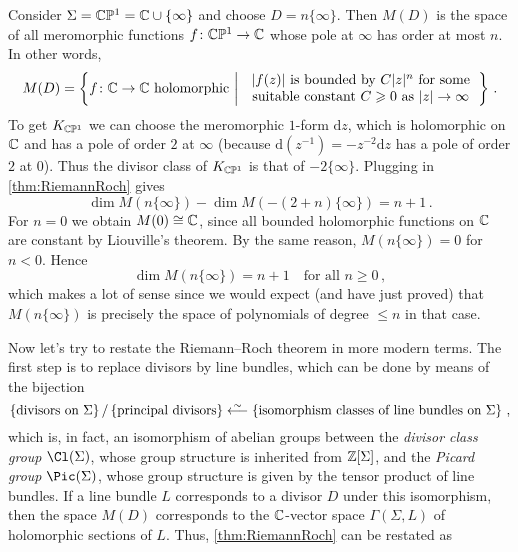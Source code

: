 	\begin{exm}
		Consider $\Sigma=\mathbb{C}\mathbb{P}^1=\mathbb{C}\cup\{\infty\}$ and choose $D=n\{\infty\}$. Then $M(D)$ is the space of all meromorphic functions $f\colon\IC\IP^1\morphism \IC$ whose pole at $\infty$ has order at most $n$. In other words,
		\begin{equation*}
			M(D)=\left\{f\colon \IC\rightarrow\IC\text{ holomorphic}\st \begin{tabular}{c}
				$|f(z)|$ is bounded by $C|z|^n$ for some\\ suitable constant $C\geq 0$ as $|z|\to\infty$
			\end{tabular}\right\}\,.
		\end{equation*}
		To get $K_{\mathbb{C}\mathbb{P}^1}$ we can choose the meromorphic $1$-form $\mathrm dz$, which is holomorphic on $\mathbb{C}$ and has a pole of order $2$ at $\infty$ (because $\mathrm d(z^{-1})=-z^{-2}\mathrm dz$ has a pole of order $2$ at $0$). Thus the divisor class of $K_{\mathbb{C}\mathbb{P}^1}$ is that of $-2\{\infty\}$. Plugging in \cref{thm:RiemannRoch} gives
		\begin{equation*}
			\dim M(n\{\infty\})-\dim M(-(2+n)\{\infty\})=n+1\,.
		\end{equation*}
		For $n=0$ we obtain $M(0)\cong\mathbb{C}$, since all bounded holomorphic functions on $\mathbb{C}$ are constant by Liouville's theorem. By the same reason, $M(n\{\infty\})=0$ for $n<0$. Hence
		\begin{equation*}
			\dim M(n\{\infty\})=n+1\quad\text{for all }n\geq 0\,,
		\end{equation*}
		which makes a lot of sense since we would expect (and have just proved) that $M(n\{\infty\})$ is precisely the space of polynomials of degree $\leq n$ in that case.
	\end{exm}
	Now let's try to restate the Riemann--Roch theorem in more modern terms. The first step is to replace divisors by line bundles, which can be done by means of the bijection
	\begin{equation*}
		\left\{\text{divisors on }\Sigma\right\}/\left\{\text{principal divisors}\right\}\lisomorphism \left\{\text{isomorphism classes of line bundles on }\Sigma\right\}\,,
	\end{equation*}
	which is, in fact, an isomorphism of abelian groups between the \emph{divisor class group} $\Cl(\Sigma)$, whose group structure is inherited from $\mathbb{Z}[\Sigma]$, and the \emph{Picard group} $\Pic(\Sigma)$, whose group structure is given by the tensor product of line bundles. If a line bundle $L$ corresponds to a divisor $D$ under this isomorphism, then the space $M(D)$ corresponds to the $\mathbb{C}$-vector space $\Gamma(\Sigma,L)$ of holomorphic sections of $L$. Thus, \cref{thm:RiemannRoch} can be restated as

